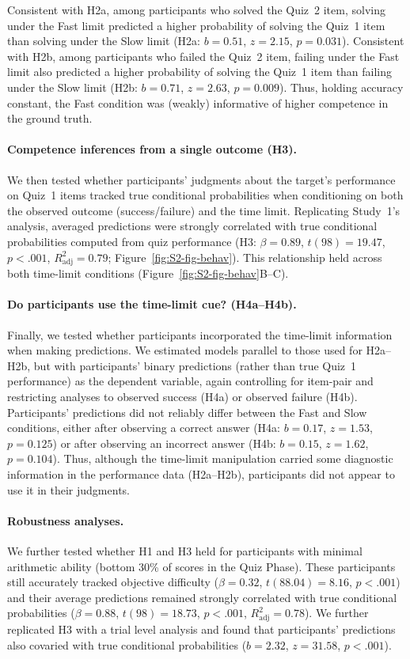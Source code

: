 \documentclass[10pt,letterpaper]{article}
\begin{document}
Consistent with H2a, among participants who solved the Quiz~2 item, solving under the Fast limit predicted a higher probability of solving the Quiz~1 item than solving under the Slow limit (H2a: $b=0.51$, $z=2.15$, $p=0.031$). Consistent with H2b, among participants who failed the Quiz~2 item, failing under the Fast limit also predicted a higher probability of solving the Quiz~1 item than failing under the Slow limit (H2b: $b=0.71$, $z=2.63$, $p=0.009$). Thus, holding accuracy constant, the Fast condition was (weakly) informative of higher competence in the ground truth.

\paragraph{Competence inferences from a single outcome (H3).}
We then tested whether participants’ judgments about the target’s performance on Quiz~1 items tracked true conditional probabilities when conditioning on both the observed outcome (success/failure) and the time limit. Replicating Study~1’s analysis, averaged predictions were strongly correlated with true conditional probabilities computed from quiz performance (H3: $\beta=0.89$, $t(98)=19.47$, $p<.001$, $R^2_{\text{adj}}=0.79$; Figure~\ref{fig:S2-fig-behav}). This relationship held across both time-limit conditions (Figure~\ref{fig:S2-fig-behav}B--C).

\paragraph{Do participants use the time-limit cue? (H4a--H4b).}
Finally, we tested whether participants incorporated the time-limit information when making predictions. We estimated models parallel to those used for H2a--H2b, but with participants’ binary predictions (rather than true Quiz~1 performance) as the dependent variable, again controlling for item-pair and restricting analyses to observed success (H4a) or observed failure (H4b). Participants’ predictions did not reliably differ between the Fast and Slow conditions, either after observing a correct answer (H4a: $b=0.17$, $z=1.53$, $p=0.125$) or after observing an incorrect answer (H4b: $b=0.15$, $z=1.62$, $p=0.104$). Thus, although the time-limit manipulation carried some diagnostic information in the performance data (H2a--H2b), participants did not appear to use it in their judgments.

\paragraph{Robustness analyses.}
We further tested whether H1 and H3 held for participants with minimal arithmetic ability (bottom 30\% of scores in the Quiz Phase). These participants still accurately tracked objective difficulty ($\beta=0.32$, $t(88.04)=8.16$, $p<.001$) and their average predictions remained strongly correlated with true conditional probabilities ($\beta=0.88$, $t(98)=18.73$, $p<.001$, $R^2_{\text{adj}}=0.78$). We further replicated H3 with a trial level analysis and found that participants’ predictions also covaried with true conditional probabilities ($b=2.32$, $z=31.58$, $p<.001$).
\end{document}
